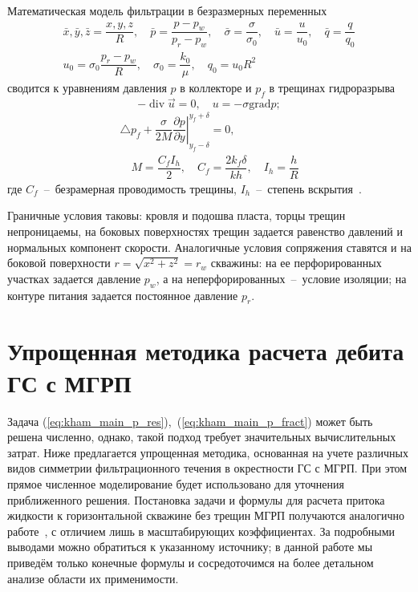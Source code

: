 \documentclass{article}
\begin{document}
Математическая модель фильтрации в безразмерных переменных
\begin{equation*}
	\displaystyle
	\begin{gathered}
		\bar{x},\bar{y},\bar{z} = \dfrac{x,y,z}{R}, \quad
		\bar{p} = \dfrac{p - p_w}{p_r - p_w}, \quad
		\bar{\sigma} = \dfrac{\sigma}{\sigma_0}, \quad
		\bar{u}=\dfrac{u}{u_0},  \quad
		\bar{q} = \dfrac{q}{q_0}    \\
		u_0 = \sigma_0 \dfrac{p_r - p_w}{R}, \quad
		\sigma_0 = \dfrac{k_0}{\mu}, \quad
		q_0 = u_0 R^2
	\end{gathered}
\end{equation*}
сводится  к уравнениям  давления $p$ в коллекторе и $p_f$ в трещинах
гидроразрыва~\cite{lit:kham_mazo_uzku_2015}
\begin{equation}
	\displaystyle
	- \operatorname{div} \vec{u} = 0, \quad u=-\sigma \text{grad} p;
	\label{eq:kham_main_p_res}
\end{equation}
\begin{equation}
	\displaystyle
	\begin{gathered}
		\triangle p_f + \dfrac{\sigma}{2M}\left.\dfrac{\partial p}{\partial y} \right|_{y_f - \delta}^{y_f + \delta} = 0, \\[8pt]
		\quad M = \dfrac{C_f I_h}{2}, \quad C_f = \dfrac{2 k_f \delta}{k h}, \quad I_h=\dfrac{h}{R}
	\end{gathered}
	\label{eq:kham_main_p_fract}
\end{equation}
где $C_f$~--~безрамерная проводимость трещины, $I_h$~--~степень
вскрытия~\cite{lit:kham_valko_economides_2001}.

Граничные условия таковы: кровля и подошва пласта, торцы трещин
непроницаемы, на боковых поверхностях трещин задается равенство давлений и
нормальных компонент скорости. Аналогичные условия сопряжения ставятся и на
боковой поверхности $r=\sqrt{x^2 + z^2} = r_w$ скважины: на ее перфорированных
участках задается давление $p_w$, а на неперфорированных~--~условие изоляции;
на контуре питания задается постоянное давление $p_r$.

\section{Упрощенная методика расчета дебита ГС с МГРП}

Задача (\ref{eq:kham_main_p_res}),~(\ref{eq:kham_main_p_fract}) может быть
решена численно, однако, такой подход требует значительных вычислительных затрат.
Ниже предлагается упрощенная методика, основанная на учете различных видов симметрии
фильтрационного течения в окрестности ГС с МГРП. При этом прямое численное моделирование
будет использовано для уточнения приближенного решения.
Постановка задачи и формулы для расчета притока жидкости к горизонтальной
скважине без трещин МГРП получаются аналогично работе~\cite{lit:kham_mazo_uzku_2015},
с отличием лишь в масштабирующих коэффициентах. За подробными выводами можно
обратиться к указанному источнику;
в данной работе мы приведём только конечные формулы и сосредоточимся
на более детальном анализе области их применимости.
\end{document}
